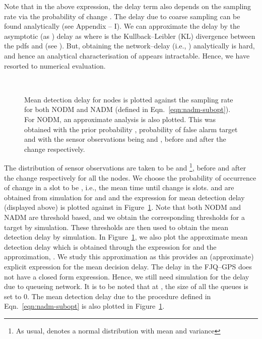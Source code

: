 \documentclass[acmtosn]{acmtrans2m}
\begin{document}
Note that in the above expression, the delay term  also depends on the sampling rate  via the 
probability of change . 
The delay due to coarse sampling 
can be found analytically (see Appendix -- I). We can approximate the 
delay  by the asymptotic
(as ) delay as
 where 
is the Kullback--Leibler (KL) divergence between the pdfs  and  
(see \cite{tartakovsky-veeravalli05general-asymptotic-quickest-change}).
But, obtaining the network--delay (i.e., ) analytically 
is hard, and hence an analytical characterisation of  appears 
intractable.  Hence, we have resorted to numerical evaluation. 
\begin{figure}[t]
   \centering \ 
   \caption{Mean detection delay for  nodes is plotted against the 
            sampling rate  for both {\sf NODM} and {\sf NADM} (defined 
            in Eqn.~\ref{eqn:nadm-subopt}). For {\sf NODM},
            an approximate analysis is also plotted. This was obtained with the 
            prior probability , probability of false alarm 
            target  and with the sensor observations
            being  and , before and after the
            change respectively.}
   \label{fig:optimal-sampling-rate}
\end{figure} 

The distribution of sensor observations are taken to be  and 
\footnote{As usual,  denotes a normal 
distribution with mean  and variance }, before and after the change 
respectively for all the  nodes. We choose the probability of occurrence 
of change in a slot to be , i.e., the mean time until change is 
 slots.  and  are obtained 
from simulation for  and  and the expression for mean 
detection delay (displayed above) is plotted against  
in Figure~\ref{fig:optimal-sampling-rate}. Note that both NODM and NADM
are threshold based, and we obtain the corresponding thresholds for 
a target  by simulation. These thresholds are then used
to obtain the mean detection delay by simulation. 
In Figure~\ref{fig:optimal-sampling-rate}, 
we also plot the approximate mean detection delay which is obtained through the 
expression for  and the approximation,
. 
We study this approximation as this provides an (approximate) explicit expression 
for the mean decision delay. The delay in the FJQ--GPS does not have a closed form 
expression. Hence, we still need simulation for the delay due to queueing network.
It is to be noted that
at , the size of all the queues is set to 0. 
The mean detection delay due to the procedure defined in Eqn.~\ref{eqn:nadm-subopt}
is also plotted in Figure~\ref{fig:optimal-sampling-rate}. 
\end{document}
